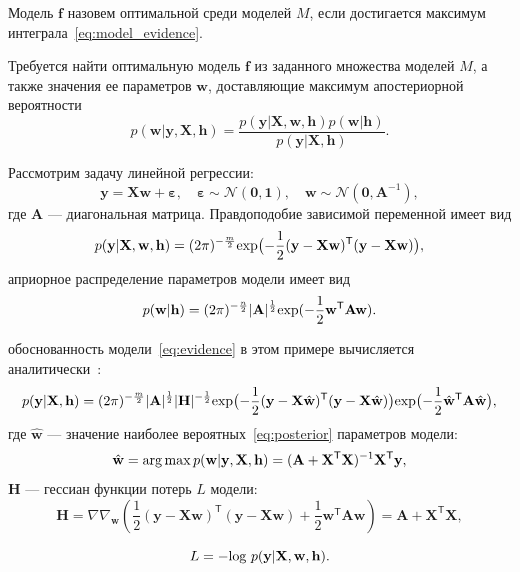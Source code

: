 \begin{defin}Модель  $\mathbf{f}$ назовем оптимальной среди моделей $M$, если достигается максимум интеграла~\eqref{eq:model_evidence}.
\end{defin}


Требуется найти оптимальную модель $\mathbf{f}$ из заданного множества моделей $M$, а также значения ее параметров $\mathbf{w}$, доставляющие максимум апостериорной вероятности
\begin{equation}
\label{eq:var_inf_posterior}
	p(\mathbf{w}|\mathbf{y},\mathbf{X},\mathbf{h}) = \frac{p(\mathbf{y}|\mathbf{X}, \mathbf{w}, \mathbf{h})p(\mathbf{w}|\mathbf{h})}{p(\mathbf{y}|\mathbf{X}, \mathbf{h})}.
\end{equation}


\begin{example}
Рассмотрим задачу линейной регрессии:
\[
	\mathbf{y} =\mathbf{X} \mathbf{w} + \boldsymbol{\varepsilon},\quad \boldsymbol{\varepsilon}  \sim \mathcal{N}(\mathbf{0},\mathbf{1}),\quad \mathbf{w} \sim  \mathcal{N}(\mathbf{0},\mathbf{A}^{-1}),
\]
где $\mathbf{A}$ --- диагональная матрица. 
Правдоподобие зависимой переменной имеет вид
\begin{equation}
\label{eq:example1}
	p(\mathbf{y}|  \mathbf{X}, \mathbf{w}, \mathbf{h}) = (2\pi) ^{-\frac{m}{2}} \textnormal{exp} \bigl(-\frac{1}{2}(\mathbf{y} -\mathbf{X} \mathbf{w})^\mathsf{T}(\mathbf{y} - \mathbf{X}\mathbf{w})\bigr),
\end{equation}
априорное распределение параметров модели имеет вид
\begin{equation}
\label{eq:prior}	
p(\mathbf{w}|\mathbf{h}) =  (2\pi) ^{-\frac{n}{2}} |\mathbf{A}|^{\frac{1}{2}} \textnormal{exp} (-\frac{1}{2}\mathbf{w}^\mathsf{T}\mathbf{A}\mathbf{w}).
\end{equation}

обоснованность модели~\eqref{eq:evidence} в этом примере вычисляется аналитически~\cite{hyperopt}:
\begin{equation}
\label{eq:ground}
	p(\mathbf{y}|\mathbf{X},\mathbf{h})  =  (2\pi) ^{-\frac{m}{2}} |\mathbf{A}|^{\frac{1}{2}} |\mathbf{H}|^{-\frac{1}{2}}  \textnormal{exp}\bigl(-\frac{1}{2}(\mathbf{y} -\mathbf{X} \hat{\mathbf{w}})^\mathsf{T}(\mathbf{y} - \mathbf{X}\hat{\mathbf{w}})\bigr)\textnormal{exp} \bigl(-\frac{1}{2}\hat{\mathbf{w}}^\mathsf{T}\mathbf{A}\hat{\mathbf{w}}\bigr),
\end{equation}
где $\hat{\mathbf{w}}$ --- значение наиболее вероятных~\eqref{eq:posterior} параметров модели:
\[
	\hat{\mathbf{w}} = \operatorname*{arg\,max} p(\mathbf{w}|\mathbf{y}, \mathbf{X}, \mathbf{h}) = (\mathbf{A} + \mathbf{X}^\mathsf{T}\mathbf{X})^{-1}\mathbf{X}^\mathsf{T}\mathbf{y},
\]
$\mathbf{H}$ --- гессиан функции потерь $L$ модели:
\[
	\mathbf{H}	= \nabla \nabla_\mathbf{w} \left(\frac{1}{2} (\mathbf{y} -\mathbf{X} {\mathbf{w}})^\mathsf{T}(\mathbf{y} - \mathbf{X}{\mathbf{w}}) + \frac{1}{2}\mathbf{w}^\mathsf{T}\mathbf{A}\mathbf{w} \right) = \mathbf{A} + \mathbf{X}^\mathsf{T}\mathbf{X},
\]

\[ 
	L = - \textnormal{log}~p(\mathbf{y}|  \mathbf{X}, \mathbf{w}, \mathbf{h}). 
\]
\end{example}

